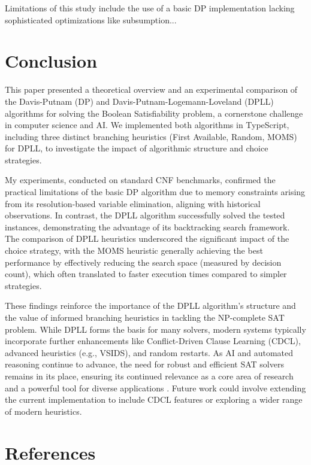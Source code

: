\documentclass[12pt, a4paper]{article}
\begin{document}
Limitations of this study include the use of a basic DP implementation lacking sophisticated optimizations like subsumption...

\section{Conclusion}
\label{sec:conclusion}

This paper presented a theoretical overview and an experimental comparison of the Davis-Putnam (DP) and Davis-Putnam-Logemann-Loveland (DPLL) algorithms for solving the Boolean Satisfiability problem, a cornerstone challenge in computer science and AI. We implemented both algorithms in TypeScript, including three distinct branching heuristics (First Available, Random, MOMS) for DPLL, to investigate the impact of algorithmic structure and choice strategies.

My experiments, conducted on standard CNF benchmarks, confirmed the practical limitations of the basic DP algorithm due to memory constraints arising from its resolution-based variable elimination, aligning with historical observations. In contrast, the DPLL algorithm successfully solved the tested instances, demonstrating the advantage of its backtracking search framework. The comparison of DPLL heuristics underscored the significant impact of the choice strategy, with the MOMS heuristic generally achieving the best performance by effectively reducing the search space (measured by decision count), which often translated to faster execution times compared to simpler strategies.

These findings reinforce the importance of the DPLL algorithm's structure and the value of informed branching heuristics in tackling the NP-complete SAT problem. While DPLL forms the basis for many solvers, modern systems typically incorporate further enhancements like Conflict-Driven Clause Learning (CDCL), advanced heuristics (e.g., VSIDS), and random restarts. As AI and automated reasoning continue to advance, the need for robust and efficient SAT solvers remains in its place, ensuring its continued relevance as a core area of research and a powerful tool for diverse applications \cite{Autoblocks}. Future work could involve extending the current implementation to include CDCL features or exploring a wider range of modern heuristics.

\section*{References}
\label{sec:references}
\end{document}
